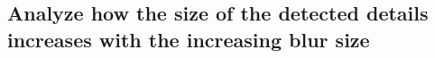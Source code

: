 \documentclass{article}
\begin{document}
\subsection{Analyze how the size of the detected details increases with the increasing blur size}
 \quad
{} \quad
{} \quad
\end{document}
